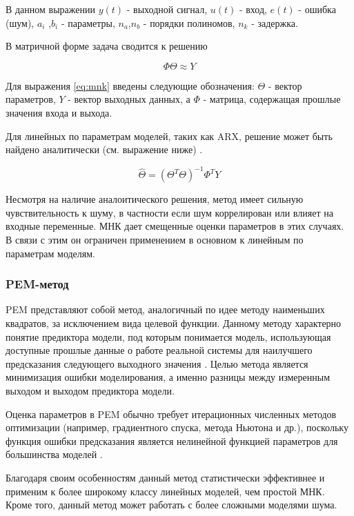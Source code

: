 В данном выражении $ y(t) $ - выходной сигнал,  $u(t)$ - вход, $e(t)$ - ошибка
(шум), $a_i$ ,$b_i$ - параметры, $n_a$,$n_b$ - порядки полиномов, $n_k$ -
задержка.

В матричной форме задача сводится к решению

\begin{equation}
  \Phi\Theta \approx Y
  \label{eq:mnk}
\end{equation}

Для выражения \ref{eq:mnk} введены следующие обозначения: $\Theta$ - вектор
параметров, $Y$ - вектор выходных данных, а $\Phi$ - матрица, содержащая прошлые
значения входа и выхода.

Для линейных по параметрам моделей, таких как ARX, решение может быть найдено
аналитически (см. выражение ниже) \cite{bib:arx}.

\begin{equation}
  \hat{\Theta} = (\Theta^T \Theta)^{-1} \Phi^T Y
  \label{eq:mnk_arx_sol}
\end{equation}

Несмотря на наличие аналоитического решения, метод имеет сильную
чувствительность к шуму, в частности если шум коррелирован или влияет на входные
переменные. МНК дает смещенные оценки параметров в этих случаях. В связи с этим
он ограничен применением в основном к линейным по параметрам моделям.

\subsubsection{PEM-метод}

PEM представляют собой метод, аналогичный по идее методу наименьших квадратов,
за исключением вида целевой функции. Данному методу характерно понятие
предиктора модели, под которым понимается модель, использующая доступные прошлые
данные о работе реальной системы для наилучшего предсказания следующего
выходного значения \cite{bib:ident:neural:SVD}. Целью метода является
минимизация ошибки моделирования, а именно разницы между измеренным выходом и
выходом предиктора модели. 

Оценка параметров в PEM обычно требует итерационных численных методов
оптимизации (например, градиентного спуска, метода Ньютона и др.), поскольку
функция ошибки предсказания является нелинейной функцией параметров для
большинства моделей \cite{bib:ident:control:nonlinear}. 

Благодаря своим особенностям данный метод статистически эффективнее и применим к
более широкому классу линейных моделей, чем простой МНК. Кроме того, данный
метод может работать с более сложными моделями шума.

